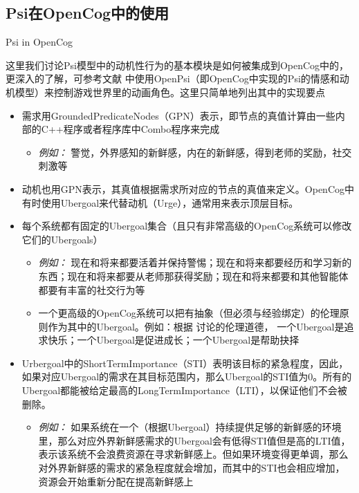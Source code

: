 \subsection{Psi在OpenCog中的使用}{Psi in OpenCog}

这里我们讨论Psi模型中的动机性行为的基本模块是如何被集成到OpenCog中的，更深入的了解，可参考文献 \cite{Zhenhua2011}中使用OpenPsi（即OpenCog中实现的Psi的情感和动机模型）来控制游戏世界里的动画角色。这里只简单地列出其中的实现要点


\begin{itemize}

\item 需求用GroundedPredicateNodes（GPN）表示，即节点的真值计算由一些内部的C++程序或者程序库中Combo程序来完成

\begin{itemize}
\item {\it 例如：} 警觉，外界感知的新鲜感，内在的新鲜感，得到老师的奖励，社交刺激等
\end{itemize}

\item 动机也用GPN表示，其真值根据需求所对应的节点的真值来定义。OpenCog中有时使用Ubergoal来代替动机（Urge），通常用来表示顶层目标。

\item 每个系统都有固定的Ubergoal集合（且只有非常高级的OpenCog系统可以修改它们的Ubergoals）

\begin{itemize}
\item {\it 例如：} 现在和将来都要活着并保持警惕；现在和将来都要经历和学习新的东西；现在和将来都要从老师那获得奖励；现在和将来都要和其他智能体都要有丰富的社交行为等

\item  一个更高级的OpenCog系统可以把有抽象（但必须与经验绑定）的伦理原则作为其中的Ubergoal。例如：根据 \cite{GoertzelHP}讨论的伦理道德， 一个Ubergoal是追求快乐；一个Ubergoal是促进成长；一个Ubergoal是帮助抉择
\end{itemize}

\item Urbergoal中的ShortTermImportance（STI）表明该目标的紧急程度，因此，如果对应Ubergoal的需求在其目标范围内，那么Ubergoal的STI值为0。所有的Ubergoal都能被给定最高的LongTermImportance（LTI），以保证他们不会被删除。

\begin{itemize}
\item {\it 例如：} 如果系统在一个（根据Ubergoal）持续提供足够的新鲜感的环境里，那么对应外界新鲜感需求的Ubergoal会有低得STI值但是高的LTI值，表示该系统不会浪费资源在寻求新鲜感上。但如果环境变得更单调，那么对外界新鲜感的需求的紧急程度就会增加，而其中的STI也会相应增加，资源会开始重新分配在提高新鲜感上


\end{itemize}
\end{itemize}
